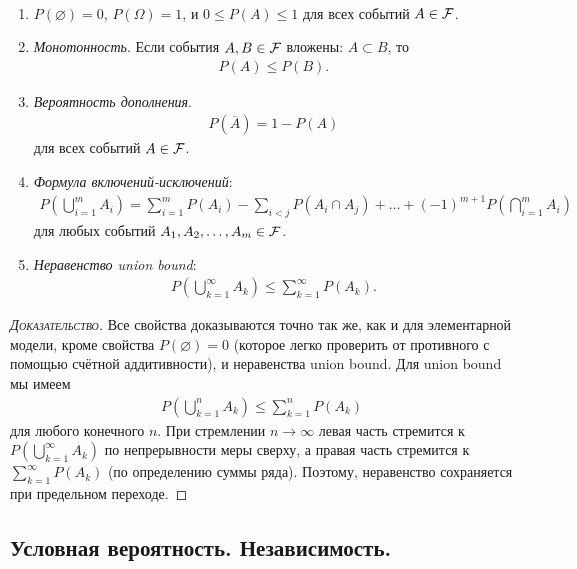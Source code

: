 \documentclass[../main.tex]{subfiles}
\begin{document}
\begin{prop}\
 \begin{enumerate}
  \item $ P(\varnothing) = 0 $, $ P(\Omega) = 1 $, и $ 0 \leqslant P(A) \leqslant 1 $ для всех событий $ A \in \mathcal F $.
  \item \emph{Монотонность}. Если события $ A,B\in\mathcal F $ вложены: $ A \subset B $, то
   \begin{align*}
    P(A) \leqslant P(B).
   \end{align*}
  \item \emph{Вероятность дополнения}.
   \begin{align*}
    P(\overline A) = 1 - P(A)
   \end{align*}
   для всех событий $ A \in \mathcal F $.
  \item \emph{Формула включений-исключений}:
   \begin{align}
    \label{eq:inclusion_exclusion}
    P \left( \bigcup_{i=1}^{m} A_i \right) = \sum_{i=1}^{m}P(A_i) - \sum_{i < j}P(A_i \cap A_j) + \ldots + (-1)^{m+1}P \left( \bigcap_{i=1}^{m}A_i \right)
   \end{align} для любых событий $ A_1, A_2, \ldots, A_m \in \mathcal F $.
  \item \emph{Неравенство union bound}:
   \begin{align*}
    P \left( \bigcup_{k=1}^{\infty}A_k \right) \leqslant \sum_{k=1}^{\infty} P(A_k).
   \end{align*}
 \end{enumerate}
\end{prop}
\begin{proof}[\normalfont\textsc{Доказательство}]
 Все свойства доказываются точно так же, как и для элементарной модели, кроме свойства $ P(\varnothing) = 0 $ (которое легко проверить от противного с помощью счётной аддитивности), и неравенства union bound. Для union bound мы имеем
 \begin{align*}
  P \left( \bigcup_{k=1}^{n}A_k \right) \leqslant \sum_{k=1}^{n}P(A_k)
 \end{align*} для любого конечного $ n $. При стремлении $ n \to \infty $  левая часть стремится к $ P \left( \bigcup_{k=1}^{\infty}A_k \right) $ по непрерывности меры сверху, а правая часть стремится к $ \sum_{k=1}^{\infty} P(A_k)$ (по определению суммы ряда). Поэтому, неравенство сохраняется при предельном переходе.
\end{proof}

\subsection{Условная вероятность. Независимость.}
\end{document}

